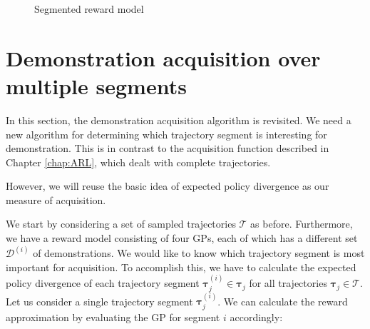 \documentclass[mscThesis.tex]{subfiles}
\begin{document}
\begin{figure}[!ht]
\caption{Segmented reward model}
\label{fig:segmented-rm}
\end{figure}

\section{Demonstration acquisition over multiple segments}
\label{sec:epd-ext}
In this section, the demonstration acquisition algorithm is revisited. We need a new algorithm for determining which trajectory segment is interesting for demonstration. This is in contrast to the acquisition function described in Chapter \ref{chap:ARL}, which dealt with complete trajectories. 

However, we will reuse the basic idea of expected policy divergence as our measure of acquisition. 

We start by considering a set of sampled trajectories $\mathcal{T}$ as before. Furthermore, we have a reward model consisting of four GPs, each of which has a different set $\mathcal{D}^{(i)}$ of demonstrations. We would like to know which trajectory segment is most important for acquisition. To accomplish this, we have to calculate the expected policy divergence of each trajectory segment $\bm{\tau}^{(i)}_j \in \bm{\tau}_j$ for all trajectories $\bm{\tau}_j \in \mathcal{T}$. Let us consider a single trajectory segment $\bm{\tau}_j^{(i)}$. We can calculate the reward approximation by evaluating the GP for segment $i$ accordingly:
\end{document}
